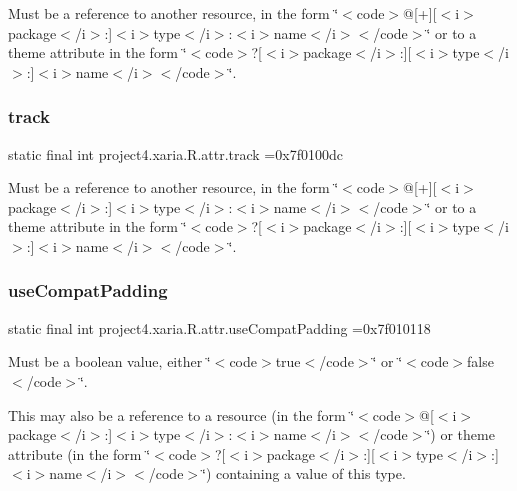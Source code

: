 Must be a reference to another resource, in the form \char`\"{}$<$code$>$@\mbox{[}+\mbox{]}\mbox{[}$<$i$>$package$<$/i$>$\+:\mbox{]}$<$i$>$type$<$/i$>$\+:$<$i$>$name$<$/i$>$$<$/code$>$\char`\"{} or to a theme attribute in the form \char`\"{}$<$code$>$?\mbox{[}$<$i$>$package$<$/i$>$\+:\mbox{]}\mbox{[}$<$i$>$type$<$/i$>$\+:\mbox{]}$<$i$>$name$<$/i$>$$<$/code$>$\char`\"{}. \mbox{\label{classproject4_1_1xaria_1_1R_1_1attr_afe97322c806849b91f5fe685aa4859aa}} 
\subsubsection{\texorpdfstring{track}{track}}
{\footnotesize\ttfamily static final int project4.\+xaria.\+R.\+attr.\+track =0x7f0100dc\hspace{0.3cm}{\ttfamily [static]}}

Must be a reference to another resource, in the form \char`\"{}$<$code$>$@\mbox{[}+\mbox{]}\mbox{[}$<$i$>$package$<$/i$>$\+:\mbox{]}$<$i$>$type$<$/i$>$\+:$<$i$>$name$<$/i$>$$<$/code$>$\char`\"{} or to a theme attribute in the form \char`\"{}$<$code$>$?\mbox{[}$<$i$>$package$<$/i$>$\+:\mbox{]}\mbox{[}$<$i$>$type$<$/i$>$\+:\mbox{]}$<$i$>$name$<$/i$>$$<$/code$>$\char`\"{}. \mbox{\label{classproject4_1_1xaria_1_1R_1_1attr_a47e880a26bb5b510f329d0e535991a58}} 
\subsubsection{\texorpdfstring{use\+Compat\+Padding}{useCompatPadding}}
{\footnotesize\ttfamily static final int project4.\+xaria.\+R.\+attr.\+use\+Compat\+Padding =0x7f010118\hspace{0.3cm}{\ttfamily [static]}}

Must be a boolean value, either \char`\"{}$<$code$>$true$<$/code$>$\char`\"{} or \char`\"{}$<$code$>$false$<$/code$>$\char`\"{}. 

This may also be a reference to a resource (in the form \char`\"{}$<$code$>$@\mbox{[}$<$i$>$package$<$/i$>$\+:\mbox{]}$<$i$>$type$<$/i$>$\+:$<$i$>$name$<$/i$>$$<$/code$>$\char`\"{}) or theme attribute (in the form \char`\"{}$<$code$>$?\mbox{[}$<$i$>$package$<$/i$>$\+:\mbox{]}\mbox{[}$<$i$>$type$<$/i$>$\+:\mbox{]}$<$i$>$name$<$/i$>$$<$/code$>$\char`\"{}) containing a value of this type. \mbox{\label{classproject4_1_1xaria_1_1R_1_1attr_aa73c92d7b18abbfa22a5eef18858ce77}} 
